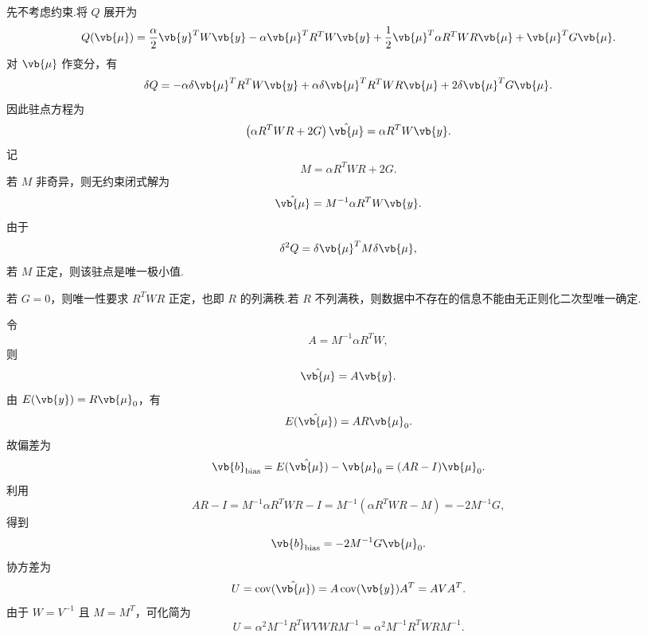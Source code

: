 先不考虑约束.将 \(Q\) 展开为
\begin{equation*}
	Q(\vb{\mu})
	=\frac{\alpha}{2}\vb{y}^TW\vb{y}
	-\alpha\vb{\mu}^TR^TW\vb{y}
	+\frac{1}{2}\vb{\mu}^T\alpha R^TWR\vb{\mu}
	+\vb{\mu}^TG\vb{\mu}.
\end{equation*}
对 \(\vb{\mu}\) 作变分，有
\begin{equation*}
	\delta Q
	=-\alpha\delta\vb{\mu}^TR^TW\vb{y}
	+\alpha\delta\vb{\mu}^TR^TWR\vb{\mu}
	+2\delta\vb{\mu}^TG\vb{\mu}.
\end{equation*}
因此驻点方程为
\begin{equation*}
	\left(\alpha R^TWR+2G\right)\hat{\vb{\mu}}
	=\alpha R^TW\vb{y}.
\end{equation*}
记
\begin{equation*}
	M=\alpha R^TWR+2G.
\end{equation*}
若 \(M\) 非奇异，则无约束闭式解为
\begin{equation*}
	\hat{\vb{\mu}}
	=M^{-1}\alpha R^TW\vb{y}.
\end{equation*}
由于
\begin{equation*}
	\delta^2Q
	=\delta\vb{\mu}^TM\delta\vb{\mu},
\end{equation*}
若 \(M\) 正定，则该驻点是唯一极小值.

\begin{notes}
	若 \(G=0\)，则唯一性要求 \(R^TWR\) 正定，也即 \(R\) 的列满秩.若 \(R\) 不列满秩，则数据中不存在的信息不能由无正则化二次型唯一确定.
\end{notes}

令
\begin{equation*}
	A=M^{-1}\alpha R^TW,
\end{equation*}
则
\begin{equation*}
	\hat{\vb{\mu}}=A\vb{y}.
\end{equation*}
由 \(E(\vb{y})=R\vb{\mu}_0\)，有
\begin{equation*}
	E(\hat{\vb{\mu}})
	=AR\vb{\mu}_0.
\end{equation*}
故偏差为
\begin{equation*}
	\vb{b}_{\rm bias}
	=E(\hat{\vb{\mu}})-\vb{\mu}_0
	=(AR-I)\vb{\mu}_0.
\end{equation*}
利用
\begin{equation*}
	AR-I
	=M^{-1}\alpha R^TWR-I
	=M^{-1}\left(\alpha R^TWR-M\right)
	=-2M^{-1}G,
\end{equation*}
得到
\begin{equation*}
	\vb{b}_{\rm bias}
	=-2M^{-1}G\vb{\mu}_0.
\end{equation*}
协方差为
\begin{equation*}
	U
	=\operatorname{cov}(\hat{\vb{\mu}})
	=A\operatorname{cov}(\vb{y})A^T
	=AVA^T.
\end{equation*}
由于 \(W=V^{-1}\) 且 \(M=M^T\)，可化简为
\begin{equation*}
	U
	=\alpha^2M^{-1}R^TWVWRM^{-1}
	=\alpha^2M^{-1}R^TWRM^{-1}.
\end{equation*}

